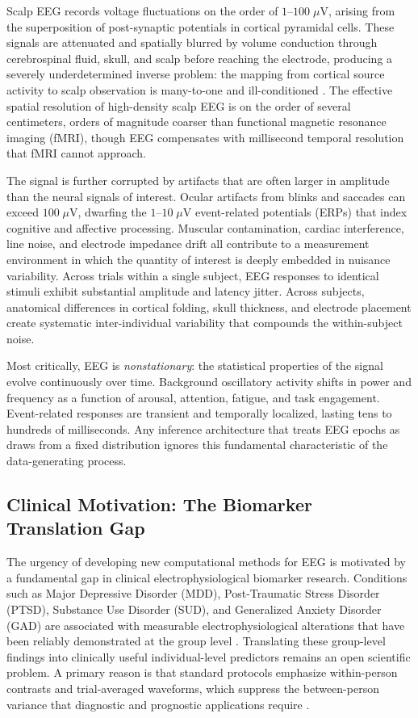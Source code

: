 Scalp EEG records voltage fluctuations on the order of $1$--$100\;\mu$V, arising from the superposition of post-synaptic potentials in cortical pyramidal cells. These signals are attenuated and spatially blurred by volume conduction through cerebrospinal fluid, skull, and scalp before reaching the electrode, producing a severely underdetermined inverse problem: the mapping from cortical source activity to scalp observation is many-to-one and ill-conditioned \cite{nunez_srinivasan_2006}. The effective spatial resolution of high-density scalp EEG is on the order of several centimeters, orders of magnitude coarser than functional magnetic resonance imaging (fMRI), though EEG compensates with millisecond temporal resolution that fMRI cannot approach.

The signal is further corrupted by artifacts that are often larger in amplitude than the neural signals of interest. Ocular artifacts from blinks and saccades can exceed $100\;\mu$V, dwarfing the $1$--$10\;\mu$V event-related potentials (ERPs) that index cognitive and affective processing. Muscular contamination, cardiac interference, line noise, and electrode impedance drift all contribute to a measurement environment in which the quantity of interest is deeply embedded in nuisance variability. Across trials within a single subject, EEG responses to identical stimuli exhibit substantial amplitude and latency jitter. Across subjects, anatomical differences in cortical folding, skull thickness, and electrode placement create systematic inter-individual variability that compounds the within-subject noise.

Most critically, EEG is \emph{nonstationary}: the statistical properties of the signal evolve continuously over time. Background oscillatory activity shifts in power and frequency as a function of arousal, attention, fatigue, and task engagement. Event-related responses are transient and temporally localized, lasting tens to hundreds of milliseconds. Any inference architecture that treats EEG epochs as draws from a fixed distribution ignores this fundamental characteristic of the data-generating process.

\subsection{Clinical Motivation: The Biomarker Translation Gap}

The urgency of developing new computational methods for EEG is motivated by a fundamental gap in clinical electrophysiological biomarker research. Conditions such as Major Depressive Disorder (MDD), Post-Traumatic Stress Disorder (PTSD), Substance Use Disorder (SUD), and Generalized Anxiety Disorder (GAD) are associated with measurable electrophysiological alterations that have been reliably demonstrated at the group level \cite{gehring_erp_2012, nelson_hajcak_2017}. Translating these group-level findings into clinically useful individual-level predictors remains an open scientific problem. A primary reason is that standard protocols emphasize within-person contrasts and trial-averaged waveforms, which suppress the between-person variance that diagnostic and prognostic applications require \cite{weinberg_hajcak_2011}.

